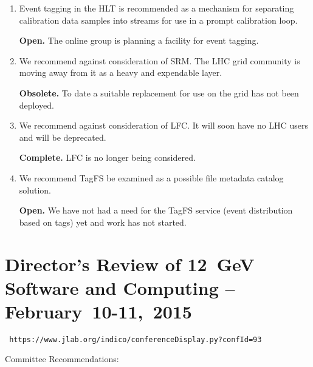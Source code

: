 \documentclass[12pt]{article}
\begin{document}
\begin{enumerate}

\item Event tagging in the HLT is recommended as a mechanism for
  separating calibration data samples into streams for use in a prompt
  calibration loop.

  {\bf Open.} The online group is planning a facility for event tagging.

\item We recommend against consideration of SRM. The LHC grid
  community is moving away from it as a heavy and expendable layer.

  {\bf Obsolete.} To date a suitable replacement for use on the grid
  has not been deployed.

\item We recommend against consideration of LFC. It will soon have no
  LHC users and will be deprecated.

  {\bf Complete.} LFC is no longer being considered.

\item We recommend TagFS be examined as a possible file metadata
  catalog solution.

  {\bf Open.} We have not had a need for the TagFS service (event
  distribution based on tags) yet and work has not started.

\end{enumerate}

\section{Director's Review of 12~GeV Software and Computing -- February~10-11,~2015}

\begin{center}\tt
https://www.jlab.org/indico/conferenceDisplay.py?confId=93
\end{center}

Committee Recommendations:
\end{document}
